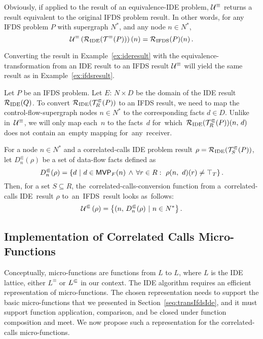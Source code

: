 {Obviously, if applied to the result of an equivalence-IDE problem, $\mathcal U^\equiv$ returns a result equivalent to the original IFDS problem result. In other words, for any IFDS problem $P$ with supergraph $N^*$, and any node $n\in N^*$,
\begin{equation}
  \mathcal U^\equiv\left(\mathcal R_{\text{IDE}}(\mathcal T^\equiv(P))\right)(n)=\mathcal R_{\text{IFDS}}(P)(n)\,.
\end{equation}

\begin{example}
  Converting the result in Example~\ref{ex:ideresult} with the equivalence-transformation from an IDE result to an IFDS result $\mathcal U^\equiv$ will yield the same result as in Example~\ref{ex:ifdsresult}.
\end{example}



Let $P$ be an IFDS problem. 
Let $E:\,N\times D$ be the domain of the IDE result $\mathcal R_{\text{IDE}}(Q)$.
To convert $\mathcal R_{\text{IDE}}(\mathcal T^\Subset_R(P))$ to an IFDS result, we need to map the control-flow-supergraph nodes $n\in N^*$ to the corresponding facts $d\in D$. 
Unlike in~$\mathcal U^\equiv$, we will only map each~$n$ to the facts~$d$ for~which~$\mathcal R_{\text{IDE}}(\mathcal T^\Subset_R(P))(n,\,d)$ does not contain an~empty mapping for~any~receiver. 

For a node $n\in N^*$ and a correlated-calls IDE problem result $\rho=\mathcal R_{\text{IDE}}(\mathcal T^\Subset_S(P))$, let $D_n^\Subset(\rho)$ be a set of data-flow facts defined as
\begin{equation}\label{eq:dnq}
  D_n^\Subset(\rho)=\left\{d\ |\ 
    d\in\mvp F(n)\,\wedge\,\forall r\in R:\ \rho(n,\ d)(r)\ne\top_T\right\}.
\end{equation}
Then, for a set $S\subseteq R$, the~correlated-calls-conversion function from a~correlated-calls IDE~result $\rho$ to~an~IFDS~result looks as~follows:
\begin{equation}\label{eq:ucc}
  \mathcal U^\Subset\left(\rho\right)=
    \left\{(n,\,D_n^\Subset(\rho)\ | \ n\in N^*\right\}.
\end{equation}
}

\subsection{Implementation of Correlated Calls Micro-Functions}

Conceptually, micro-functions are functions from $L$ to $L$, where $L$
is the IDE lattice, either $L^\equiv$ or $L^\Subset$ in our context. 
The IDE algorithm requires an efficient representation of micro-functions.
The chosen representation needs to support the basic micro-functions that
we presented in Section~\ref{seq:transIfdsIde}, and it must
support function application, comparison, and be closed under function composition
and meet. We now propose such a representation for the correlated-calls micro-functions.

